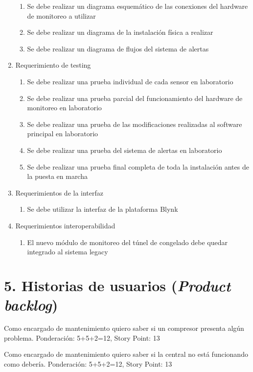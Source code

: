 \documentclass[
11pt, %
]{charter}
\begin{document}
\begin{enumerate}
\begin{enumerate}
			\item Se debe realizar un diagrama esquemático de las conexiones del hardware de monitoreo a utilizar
			\item Se debe realizar un diagrama de la instalación física a realizar
			\item Se debe realizar un diagrama de flujos del sistema de alertas
		\end{enumerate}
	\item Requerimiento de testing
		\begin{enumerate}		
			\item Se debe realizar una prueba individual de cada sensor en laboratorio
			\item Se debe realizar una prueba parcial del funcionamiento del hardware de monitoreo en laboratorio
			\item Se debe realizar una prueba de las modificaciones realizadas al software principal en laboratorio
			\item Se debe realizar una prueba del sistema de alertas en laboratorio
			\item Se debe realizar una prueba final completa de toda la instalación antes de la puesta en marcha
		\end{enumerate}
	\item Requerimientos de la interfaz
		\begin{enumerate}		
			\item Se debe utilizar la interfaz de la plataforma Blynk
		\end{enumerate}
	\item Requerimientos interoperabilidad
		\begin{enumerate}		
			\item El nuevo módulo de monitoreo del túnel de congelado debe quedar integrado al sistema legacy
		\end{enumerate}
\end{enumerate}

\section{5. Historias de usuarios (\textit{Product backlog})}
\label{sec:backlog}

Como encargado de mantenimiento quiero saber si un compresor presenta algún problema. Ponderación: 5+5+2=12, Story Point: 13

Como encargado de mantenimiento quiero saber si la central no está funcionando como debería. Ponderación: 5+5+2=12, Story Point: 13
\end{document}
